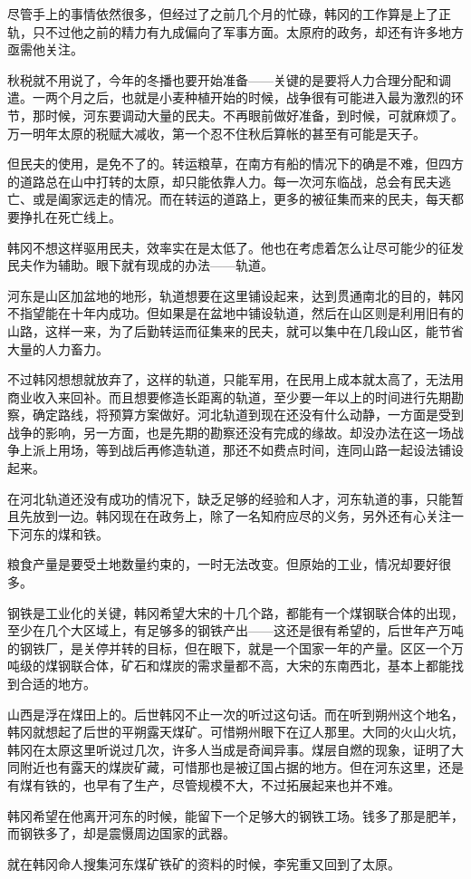 尽管手上的事情依然很多，但经过了之前几个月的忙碌，韩冈的工作算是上了正轨，只不过他之前的精力有九成偏向了军事方面。太原府的政务，却还有许多地方亟需他关注。

秋税就不用说了，今年的冬播也要开始准备——关键的是要将人力合理分配和调遣。一两个月之后，也就是小麦种植开始的时候，战争很有可能进入最为激烈的环节，那时候，河东要调动大量的民夫。不再眼前做好准备，到时候，可就麻烦了。万一明年太原的税赋大减收，第一个忍不住秋后算帐的甚至有可能是天子。

但民夫的使用，是免不了的。转运粮草，在南方有船的情况下的确是不难，但四方的道路总在山中打转的太原，却只能依靠人力。每一次河东临战，总会有民夫逃亡、或是阖家远走的情况。而在转运的道路上，更多的被征集而来的民夫，每天都要挣扎在死亡线上。

韩冈不想这样驱用民夫，效率实在是太低了。他也在考虑着怎么让尽可能少的征发民夫作为辅助。眼下就有现成的办法——轨道。

河东是山区加盆地的地形，轨道想要在这里铺设起来，达到贯通南北的目的，韩冈不指望能在十年内成功。但如果是在盆地中铺设轨道，然后在山区则是利用旧有的山路，这样一来，为了后勤转运而征集来的民夫，就可以集中在几段山区，能节省大量的人力畜力。

不过韩冈想想就放弃了，这样的轨道，只能军用，在民用上成本就太高了，无法用商业收入来回补。而且想要修造长距离的轨道，至少要一年以上的时间进行先期勘察，确定路线，将预算方案做好。河北轨道到现在还没有什么动静，一方面是受到战争的影响，另一方面，也是先期的勘察还没有完成的缘故。却没办法在这一场战争上派上用场，等到战后再修造轨道，那还不如费点时间，连同山路一起设法铺设起来。

在河北轨道还没有成功的情况下，缺乏足够的经验和人才，河东轨道的事，只能暂且先放到一边。韩冈现在在政务上，除了一名知府应尽的义务，另外还有心关注一下河东的煤和铁。

粮食产量是要受土地数量约束的，一时无法改变。但原始的工业，情况却要好很多。

钢铁是工业化的关键，韩冈希望大宋的十几个路，都能有一个煤钢联合体的出现，至少在几个大区域上，有足够多的钢铁产出——这还是很有希望的，后世年产万吨的钢铁厂，是关停并转的目标，但在眼下，就是一个国家一年的产量。区区一个万吨级的煤钢联合体，矿石和煤炭的需求量都不高，大宋的东南西北，基本上都能找到合适的地方。

山西是浮在煤田上的。后世韩冈不止一次的听过这句话。而在听到朔州这个地名，韩冈就想起了后世的平朔露天煤矿。可惜朔州眼下在辽人那里。大同的火山火坑，韩冈在太原这里听说过几次，许多人当成是奇闻异事。煤层自燃的现象，证明了大同附近也有露天的煤炭矿藏，可惜那也是被辽国占据的地方。但在河东这里，还是有煤有铁的，也早有了生产，尽管规模不大，不过拓展起来也并不难。

韩冈希望在他离开河东的时候，能留下一个足够大的钢铁工场。钱多了那是肥羊，而钢铁多了，却是震慑周边国家的武器。

就在韩冈命人搜集河东煤矿铁矿的资料的时候，李宪重又回到了太原。

